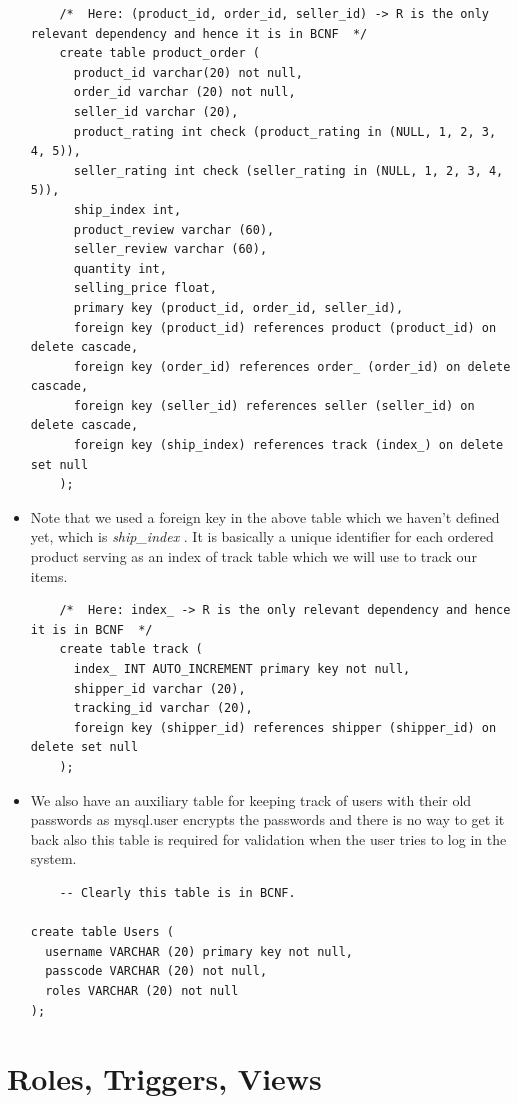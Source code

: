 \documentclass[a4paper,12pt]{article}
\newcommand{\ita}[1]{
    \textit{#1}
}
\begin{document}
\begin{itemize}
\begin{verbatim}
    /*  Here: (product_id, order_id, seller_id) -> R is the only relevant dependency and hence it is in BCNF  */
    create table product_order (
      product_id varchar(20) not null,
      order_id varchar (20) not null,
      seller_id varchar (20),
      product_rating int check (product_rating in (NULL, 1, 2, 3, 4, 5)),
      seller_rating int check (seller_rating in (NULL, 1, 2, 3, 4, 5)),
      ship_index int,
      product_review varchar (60),
      seller_review varchar (60),
      quantity int,
      selling_price float,
      primary key (product_id, order_id, seller_id),
      foreign key (product_id) references product (product_id) on delete cascade,
      foreign key (order_id) references order_ (order_id) on delete cascade,
      foreign key (seller_id) references seller (seller_id) on delete cascade,
      foreign key (ship_index) references track (index_) on delete set null
    );
  \end{verbatim}
  \item Note that we used a foreign key in the above table which we haven't defined yet, which is \ita{ship\_index}. It is basically a unique identifier for each ordered product serving as an index of track table which we will use to track our items.
  \begin{verbatim}
    /*  Here: index_ -> R is the only relevant dependency and hence it is in BCNF  */
    create table track (
      index_ INT AUTO_INCREMENT primary key not null,
      shipper_id varchar (20),
      tracking_id varchar (20),
      foreign key (shipper_id) references shipper (shipper_id) on delete set null
    );
  \end{verbatim}
  \item We also have an auxiliary table for keeping track of users with their old passwords as mysql.user encrypts the passwords and there is no way to get it back also this table is required for validation when the user tries to log in the system.
  \begin{verbatim}
    -- Clearly this table is in BCNF.

create table Users (
  username VARCHAR (20) primary key not null,
  passcode VARCHAR (20) not null,
  roles VARCHAR (20) not null
);
  \end{verbatim}
\end{itemize}
\newpage
\section{Roles, Triggers, Views}
\end{document}
